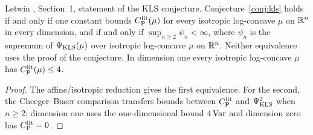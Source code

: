 \begin{lemma}
  \label{lem:letwin-kls-conjecture-forms}
  \leanok
  Letwin \cite{Letwin2026QuadraticKLS}, Section~1, statement of the KLS conjecture. Conjecture~\ref{conj:kls} holds if
  and only if one constant bounds $C_{\mathrm P}^{\mathrm{lit}}(\mu)$ for every isotropic log-concave $\mu$ on $\mathbb{R}^n$ in every dimension, and
  if and only if $\sup_{n\ge2}\psi_n<\infty$, where $\psi_n$ is the supremum of $\Psi_{\mathrm{KLS}}(\mu)$ over isotropic
  log-concave $\mu$ on $\mathbb{R}^n$. Neither equivalence uses the proof of the conjecture. In dimension one every isotropic
  log-concave $\mu$ has $C_{\mathrm P}^{\mathrm{lit}}(\mu)\le4$.
\end{lemma}
\begin{proof}
  \leanok
  The affine/isotropic reduction gives the first equivalence. For the second, the Cheeger--Buser comparison transfers
  bounds between $C_{\mathrm P}^{\mathrm{lit}}$ and $\Psi_{\mathrm{KLS}}^2$ when $n\ge2$; dimension one uses the one-dimensional bound $4\operatorname{Var}$ and
  dimension zero has $C_{\mathrm P}^{\mathrm{lit}}=0$.
\end{proof}

